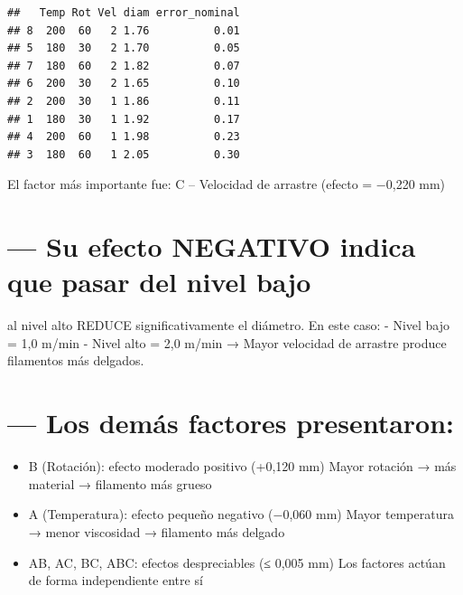 \documentclass[
]{article}
\newenvironment{Shaded}{\begin{snugshade}}{\end{snugshade}}
\newcommand{\FunctionTok}[1]{\textcolor[rgb]{0.13,0.29,0.53}{\textbf{#1}}}
\newcommand{\NormalTok}[1]{#1}
\newcommand{\SpecialCharTok}[1]{\textcolor[rgb]{0.81,0.36,0.00}{\textbf{#1}}}
\newcommand{\StringTok}[1]{\textcolor[rgb]{0.31,0.60,0.02}{#1}}
\providecommand{\tightlist}{%
  \setlength{\itemsep}{0pt}\setlength{\parskip}{0pt}}
\begin{document}
\begin{Shaded}
\end{Shaded}

\begin{verbatim}
##   Temp Rot Vel diam error_nominal
## 8  200  60   2 1.76          0.01
## 5  180  30   2 1.70          0.05
## 7  180  60   2 1.82          0.07
## 6  200  30   2 1.65          0.10
## 2  200  30   1 1.86          0.11
## 1  180  30   1 1.92          0.17
## 4  200  60   1 1.98          0.23
## 3  180  60   1 2.05          0.30
\end{verbatim}

El factor más importante fue: C -- Velocidad de arrastre (efecto =
−0,220 mm)

\section{--- Su efecto NEGATIVO indica que pasar del nivel
bajo}\label{su-efecto-negativo-indica-que-pasar-del-nivel-bajo}

al nivel alto REDUCE significativamente el diámetro. En este caso: -
Nivel bajo = 1,0 m/min - Nivel alto = 2,0 m/min → Mayor velocidad de
arrastre produce filamentos más delgados.

\section{--- Los demás factores
presentaron:}\label{los-demuxe1s-factores-presentaron}

\begin{itemize}
\tightlist
\item
  B (Rotación): efecto moderado positivo (+0,120 mm) Mayor rotación →
  más material → filamento más grueso
\item
  A (Temperatura): efecto pequeño negativo (−0,060 mm) Mayor temperatura
  → menor viscosidad → filamento más delgado
\item
  AB, AC, BC, ABC: efectos despreciables (≤ 0,005 mm) Los factores
  actúan de forma independiente entre sí
\end{itemize}
\end{document}
